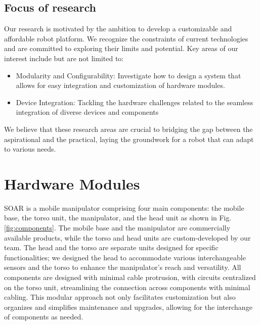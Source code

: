 \documentclass[runningheads,a4paper]{llncs}
\begin{document}
\subsection{Focus of research}
Our research is motivated by the ambition to develop a customizable and affordable robot platform.
We recognize the constraints of current technologies and are committed to exploring their limits and potential. Key areas of our interest include but are not limited to:
\begin{itemize}
	\item Modularity and Configurability: Investigate how to design a system that allows for easy integration and customization of hardware modules.
	\item Device Integration: Tackling the hardware challenges related to the seamless integration of diverse devices and components
\end{itemize}
We believe that these research areas are crucial to bridging the gap between the aspirational and the practical, laying the groundwork for a robot that can adapt to various needs.

\section{Hardware Modules}
SOAR is a mobile manipulator comprising four main components: the mobile base, the torso unit, the manipulator, and the head unit as shown in Fig. \ref{fig:components}.
The mobile base and the manipulator are commercially available products, while the torso and head units are custom-developed by our team.
The head and the torso are separate units designed for specific functionalities; we designed the head to accommodate various interchangeable sensors and the torso to enhance the manipulator's reach and versatility.
All components are designed with minimal cable protrusion, with circuits centralized on the torso unit, streamlining the connection across components with minimal cabling.
This modular approach not only facilitates customization but also organizes and simplifies maintenance and upgrades, allowing for the interchange of components as needed.
\end{document}
